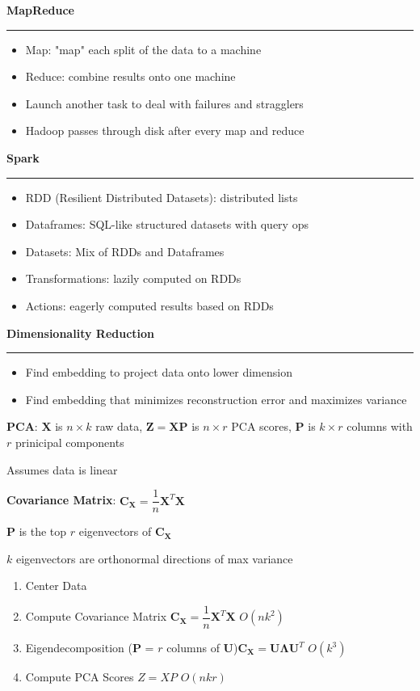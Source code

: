 \documentclass[8pt,letter,landscape]{article}
\newcommand{\sectiontitle}[1]{\textbf{\large #1}\vspace{0.2em}\hrule\vspace{0.5em}}
\begin{document}
\begin{multicols*}{3}

\sectiontitle{MapReduce}
\begin{itemize}[leftmargin=*,nosep]
    \item Map: "map" each split of the data to a machine
    \item Reduce: combine results onto one machine
    \item Launch another task to deal with failures and stragglers
    \item Hadoop passes through disk after every map and reduce
\end{itemize}

\sectiontitle{Spark}
\begin{itemize}[leftmargin=*,nosep]
    \item RDD (Resilient Distributed Datasets): distributed lists
    \item Dataframes: SQL-like structured datasets with query ops
    \item Datasets: Mix of RDDs and Dataframes
    \item Transformations: lazily computed on RDDs
    \item Actions: eagerly computed results based on RDDs
\end{itemize}

\sectiontitle{Dimensionality Reduction}
\begin{itemize}[leftmargin=*,nosep]
    \item Find embedding to project data onto lower dimension
    \item Find embedding that minimizes reconstruction error and maximizes variance
\end{itemize}

\textbf{PCA}: $\mathbf{X}$ is $n \times k$ raw data, $\mathbf{Z} = \mathbf{XP}$ is $n \times r$ PCA scores, $\mathbf{P}$ is $k \times r$ columns with $r$ prinicipal components

Assumes data is linear

\textbf{Covariance Matrix}: $\mathbf{C_X} = \dfrac{1}{n} \mathbf{X}^T \mathbf{X}$

$\mathbf{P}$ is the top $r$ eigenvectors of $\mathbf{C_X}$

$k$ eigenvectors are orthonormal directions of max variance

\begin{enumerate}[leftmargin=*,nosep]
    \item Center Data
    \item Compute Covariance Matrix $\mathbf{C_X} = \dfrac{1}{n} \mathbf{X}^T \mathbf{X}$ $O(nk^2)$
    \item Eigendecomposition ($\mathbf{P}$ = $r$ columns of $\mathbf{U}$)$\mathbf{C_X} = \mathbf{U \Lambda U}^T$ $O(k^3)$
    \item Compute PCA Scores $Z = XP$ $O(nkr)$
\end{enumerate}


\end{multicols*}
\end{document}
